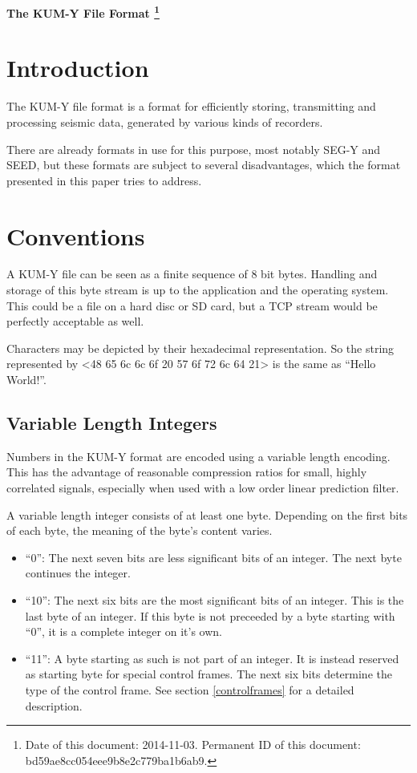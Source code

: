 \documentclass[DIV=10]{scrartcl}
\begin{document}
\strut

\vspace{1cm}

\centerline{\huge \textbf{The KUM-Y File Format%
\footnote{\raggedright Date of this document: 2014-11-03.
Permanent ID of this document: bd59ae8cc054eee9b8e2c779ba1b6ab9.}}}

\vspace{1cm}

\section{Introduction}

The KUM-Y file format is a format for efficiently storing, transmitting and processing seismic data, generated by various kinds of recorders.

There are already formats in use for this purpose, most notably SEG-Y and SEED, but these formats are subject to several disadvantages, which the format presented in this paper tries to address.

\section{Conventions}

A KUM-Y file can be seen as a finite sequence of 8 bit bytes.
Handling and storage of this byte stream is up to the application and the operating system.
This could be a file on a hard disc or SD card, but a TCP stream would be perfectly acceptable as well.

Characters may be depicted by their hexadecimal representation.
So the string represented by <48 65 6c 6c 6f 20 57 6f 72 6c 64 21> is the same as “Hello World!”.

\subsection{Variable Length Integers}
\label{varint}

Numbers in the KUM-Y format are encoded using a variable length encoding.
This has the advantage of reasonable compression ratios for small, highly correlated signals, especially when used with a low order linear prediction filter.

A variable length integer consists of at least one byte.
Depending on the first bits of each byte, the meaning of the byte’s content varies.

\begin{itemize}
\item “0”: The next seven bits are less significant bits of an integer.
The next byte continues the integer.
\item “10”: The next six bits are the most significant bits of an integer.
This is the last byte of an integer.
If this byte is not preceeded by a byte starting with “0”, it is a complete integer on it’s own.
\item “11”: A byte starting as such is not part of an integer.
It is instead reserved as starting byte for special control frames.
The next six bits determine the type of the control frame.
See section \ref{controlframes} for a detailed description.
\end{itemize}
\end{document}
